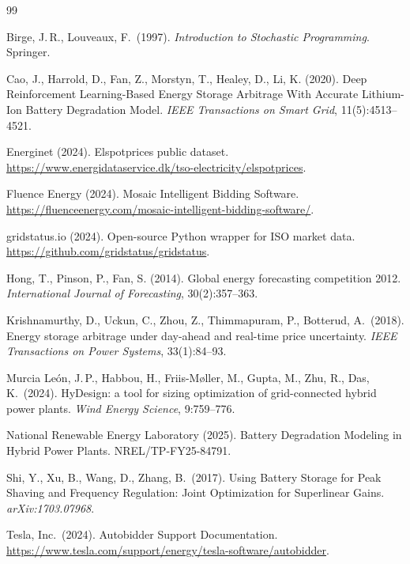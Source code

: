 \documentclass[11pt]{article}
\begin{document}

\begin{thebibliography}{99}

Birge, J.\,R., Louveaux, F.\ (1997). \emph{Introduction to Stochastic Programming}. Springer.

Cao, J., Harrold, D., Fan, Z., Morstyn, T., Healey, D., Li, K. (2020). Deep Reinforcement Learning-Based Energy Storage Arbitrage With Accurate Lithium-Ion Battery Degradation Model. \emph{IEEE Transactions on Smart Grid}, 11(5):4513--4521.

Energinet (2024). Elspotprices public dataset. \url{https://www.energidataservice.dk/tso-electricity/elspotprices}.

Fluence Energy (2024). Mosaic Intelligent Bidding Software. \url{https://fluenceenergy.com/mosaic-intelligent-bidding-software/}.

gridstatus.io (2024). Open-source Python wrapper for ISO market data. \url{https://github.com/gridstatus/gridstatus}.

Hong, T., Pinson, P., Fan, S. (2014). Global energy forecasting competition 2012. \emph{International Journal of Forecasting}, 30(2):357--363.

Krishnamurthy, D., Uckun, C., Zhou, Z., Thimmapuram, P., Botterud, A.\ (2018). Energy storage arbitrage under day-ahead and real-time price uncertainty. \emph{IEEE Transactions on Power Systems}, 33(1):84--93.

Murcia Le\'{o}n, J.\,P., Habbou, H., Friis-M\o ller, M., Gupta, M., Zhu, R., Das, K.\ (2024). HyDesign: a tool for sizing optimization of grid-connected hybrid power plants. \emph{Wind Energy Science}, 9:759--776.

National Renewable Energy Laboratory (2025). Battery Degradation Modeling in Hybrid Power Plants. NREL/TP-FY25-84791.

Shi, Y., Xu, B., Wang, D., Zhang, B.\ (2017). Using Battery Storage for Peak Shaving and Frequency Regulation: Joint Optimization for Superlinear Gains. \emph{arXiv:1703.07968}.

Tesla, Inc.\ (2024). Autobidder Support Documentation. \url{https://www.tesla.com/support/energy/tesla-software/autobidder}.


\end{thebibliography}
\end{document}
